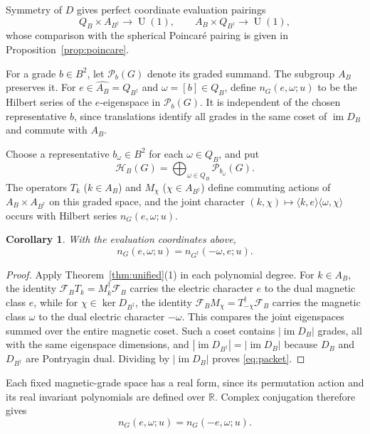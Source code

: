 \documentclass[11pt,a4paper,reqno]{amsart}
\theoremstyle{plain}
\newtheorem{corollary}[theorem]{Corollary}
\theoremstyle{definition}
\theoremstyle{remark}
\numberwithin{equation}{section}
\DeclareMathOperator{\im}{im}
\newcommand{\UU}{\operatorname{U}}
\newcommand{\RR}{\mathbb R}
\newcommand{\cP}{\mathcal P}
\newcommand{\cH}{\mathcal H}
\newcommand{\pair}[2]{\langle #1,#2\rangle}
\begin{document}
Symmetry of $D$ gives perfect coordinate evaluation pairings
\[
Q_B\times A_{B^\dagger}\longrightarrow\UU(1), \qquad A_B\times Q_{B^\dagger}\longrightarrow\UU(1),
\]
whose comparison with the spherical Poincar\'e pairing is given in Proposition~\ref{prop:poincare}.

For a grade $b\in B^2$, let $\cP_b(G)$ denote its graded summand. The subgroup $A_B$ preserves it. For $e\in\widehat{A_B}=Q_{B^\dagger}$ and $\omega=[b]\in Q_B$, define $n_G(e,\omega;u)$ to be the Hilbert series of the $e$-eigenspace in $\cP_b(G)$. It is independent of the chosen representative $b$, since translations identify all grades in the same coset of $\im D_B$ and commute with $A_B$.

Choose a representative $b_\omega\in B^2$ for each $\omega\in Q_B$, and put
\[
\cH_B(G)=\bigoplus_{\omega\in Q_B}\cP_{b_\omega}(G).
\]
The operators $T_k$ ($k\in A_B$) and $M_\chi$ ($\chi\in A_{B^\dagger}$) define commuting actions of $A_B\times A_{B^\dagger}$ on this graded space, and the joint character $(k,\chi)\mapsto\pair{k}{e}\pair{\omega}{\chi}$ occurs with Hilbert series $n_G(e,\omega;u)$.

\begin{corollary}\label{cor:packets} With the evaluation coordinates above,
\begin{equation}\label{eq:packet}
n_G(e,\omega;u)=n_{G^\dagger}(-\omega,e;u).
\end{equation}
\end{corollary}
\begin{proof}
Apply Theorem~\ref{thm:unified}\textup{(1)} in each polynomial degree. For $k\in A_B$, the identity $\mathcal F_B T_k=M_k^\dagger\mathcal F_B$ carries the electric character $e$ to the dual magnetic class $e$, while for $\chi\in\ker D_{B^\dagger}$, the identity $\mathcal F_B M_\chi=T_{-\chi}^\dagger\mathcal F_B$ carries the magnetic class $\omega$ to the dual electric character $-\omega$. This compares the joint eigenspaces summed over the entire magnetic coset. Such a coset contains $|\im D_B|$ grades, all with the same eigenspace dimensions, and $|\im D_{B^\dagger}|=|\im D_B|$ because $D_B$ and $D_{B^\dagger}$ are Pontryagin dual. Dividing by $|\im D_B|$ proves \eqref{eq:packet}.
\end{proof}

Each fixed magnetic-grade space has a real form, since its permutation action and its real invariant polynomials are defined over $\RR$. Complex conjugation therefore gives
\begin{equation}\label{eq:realform}
n_G(e,\omega;u)=n_G(-e,\omega;u).
\end{equation}
\end{document}
